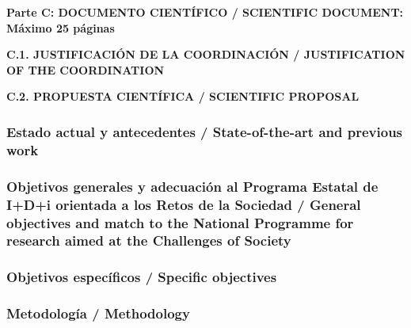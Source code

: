 \documentclass[a4paper,11pt,oneside]{article}
\begin{document}
\begin{tcolorbox}[colback=yellow,arc=0pt,outer arc=0pt,colframe=black,boxrule=0.6pt,left=0mm]
  \noindent\textbf{Parte C: DOCUMENTO CIENTÍFICO / SCIENTIFIC DOCUMENT: Máximo 25 páginas}
\end{tcolorbox}

\vspace{12pt}

\noindent\textbf{C.1. JUSTIFICACIÓN DE LA COORDINACIÓN / JUSTIFICATION OF THE COORDINATION}
\vspace{12pt}



\vspace{12pt}

\noindent\textbf{C.2. PROPUESTA CIENTÍFICA / SCIENTIFIC PROPOSAL}

\subsubsection*{\label{subsubsec:stateoftheart}Estado actual y antecedentes /  State-of-the-art and previous work}

%
%

\subsubsection*{Objetivos generales y adecuación al Programa Estatal de I+D+i orientada a los Retos de la Sociedad / General objectives and match to the National Programme for research aimed at the Challenges of Society}

%
%

\subsubsection*{Objetivos específicos / Specific objectives}
%

%
%
%
%

\subsubsection*{Metodolog\'ia / Methodology}
\end{document}
